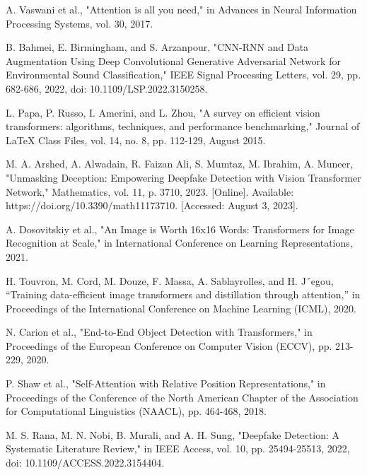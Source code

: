 \begin{thebibliography}{99}
        \item\label{ref9} A. Vaswani et al., "Attention is all you need," in Advances in Neural Information Processing Systems, vol. 30, 2017.
        
        \item\label{ref10} B. Bahmei, E. Birmingham, and S. Arzanpour, "CNN-RNN and Data Augmentation Using Deep Convolutional Generative Adversarial Network for Environmental Sound Classification," IEEE Signal Processing Letters, vol. 29, pp. 682-686, 2022, doi: 10.1109/LSP.2022.3150258.
        
        \item\label{ref11} L. Papa, P. Russo, I. Amerini, and L. Zhou, "A survey on efficient vision transformers: algorithms, techniques, and performance benchmarking," Journal of LaTeX Class Files, vol. 14, no. 8, pp. 112-129, August 2015.
        
        \item\label{ref12} M. A. Arshed, A. Alwadain, R. Faizan Ali, S. Mumtaz, M. Ibrahim, A. Muneer, "Unmasking Deception: Empowering Deepfake Detection with Vision Transformer Network," Mathematics, vol. 11, p. 3710, 2023. [Online]. Available: https://doi.org/10.3390/math11173710. [Accessed: August 3, 2023].
        
        \item\label{ref13} A. Dosovitskiy et al., "An Image is Worth 16x16 Words: Transformers for Image Recognition at Scale," in International Conference on Learning Representations, 2021.
        
        \item\label{ref14} H. Touvron, M. Cord, M. Douze, F. Massa, A. Sablayrolles, and H. J´egou, “Training data-efficient image transformers and distillation through attention,” in Proceedings of the International Conference on Machine Learning (ICML), 2020.
        
        \item\label{ref15} N. Carion et al., "End-to-End Object Detection with Transformers," in Proceedings of the European Conference on Computer Vision (ECCV), pp. 213-229, 2020.
        
        \item\label{ref16} P. Shaw et al., "Self-Attention with Relative Position Representations," in Proceedings of the Conference of the North American Chapter of the Association for Computational Linguistics (NAACL), pp. 464-468, 2018.
        
        \item\label{ref17} M. S. Rana, M. N. Nobi, B. Murali, and A. H. Sung, "Deepfake Detection: A Systematic Literature Review," in IEEE Access, vol. 10, pp. 25494-25513, 2022, doi: 10.1109/ACCESS.2022.3154404.

\end{thebibliography}
